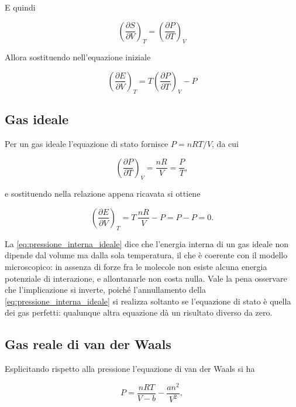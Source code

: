 E quindi 

\begin{equation}
    \left( \frac{\partial S}{\partial V} \right)_T = \left( \frac{\partial P}{\partial T} \right)_V
\end{equation}

Allora sostituendo nell'equazione iniziale

\begin{equation}
    \left(\frac{\partial E}{\partial V}\right)_T = T \left( \frac{\partial P}{\partial T} \right)_V - P
\end{equation}

\subsection{Gas ideale}

Per un gas ideale l'equazione di stato fornisce $P = nRT/V$, da cui

\begin{equation}
    \left(\frac{\partial P}{\partial T}\right)_V = \frac{nR}{V} = \frac{P}{T} ,
    \label{eq:derivata_ideale}
\end{equation}

e sostituendo nella relazione appena ricavata si ottiene

\begin{equation}
    \left(\frac{\partial E}{\partial V}\right)_T = T\,\frac{nR}{V} - P = P - P = 0 .
    \label{eq:pressione_interna_ideale}
\end{equation}

La \eqref{eq:pressione_interna_ideale} dice che l'energia interna di un gas ideale non dipende dal volume ma dalla sola temperatura, il che è coerente con il modello microscopico: in assenza di forze fra le molecole non esiste alcuna energia potenziale di interazione, e allontanarle non costa nulla.
Vale la pena osservare che l'implicazione si inverte, poiché l'annullamento della \eqref{eq:pressione_interna_ideale} si realizza soltanto se l'equazione di stato è quella dei gas perfetti: qualunque altra equazione dà un risultato diverso da zero.

\subsection{Gas reale di van der Waals}

Esplicitando rispetto alla pressione l'equazione di van der Waals si ha

\begin{equation}
    P = \frac{nRT}{V - b} - \frac{an^2}{V^2} ,
    \label{eq:vdw_esplicita_cap}
\end{equation}

